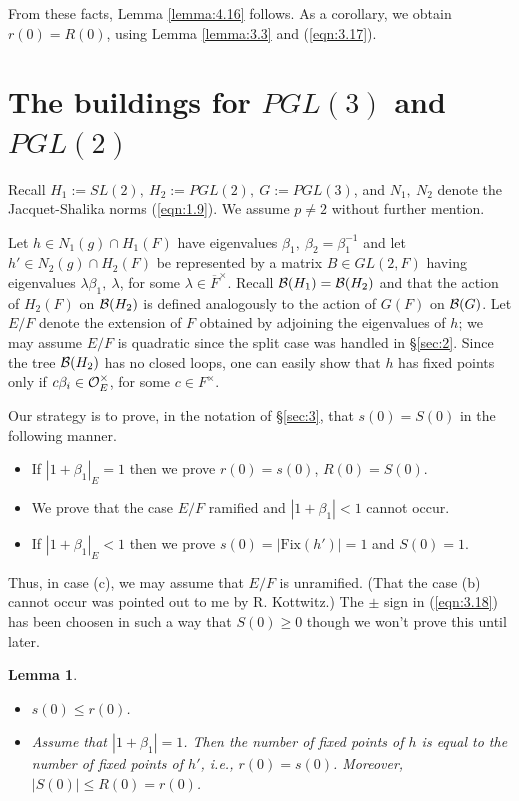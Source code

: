 \documentclass[12pt,letterpaper]{article}
\newtheorem{lemma}[theorem]{Lemma}
\def\oee{{\cal O}_E}
\def\bbg{{\cal B}(G)}
\def\bbh{{\cal B}(H)}
\def\bbH1{{\cal B}(H_1)}
\def\bbh2{{\cal B}(H_2)}
\begin{document}
From these facts, Lemma \ref{lemma:4.16} follows. 
As a corollary, we obtain $r(0)=R(0)$,
using Lemma \ref{lemma:3.3} and (\ref{eqn:3.17}).





\section{The buildings for $PGL(3)$ and $PGL(2)$}
\label{sec:5}

Recall $H_1:=SL(2),\ H_2:=PGL(2),\ G:=PGL(3)$, and $N_1,\ N_2$
denote the Jacquet-Shalika norms (\ref{eqn:1.9}). 
We assume $p\not= 2$ without further mention.
 
Let $h \in N_1(g)\cap H_1(F)$ have eigenvalues $\beta_1,\
\beta_2=\beta_1^{-1}$ and
let $h'\in N_2(g)\cap H_2(F)$ be represented by a matrix $B\in GL(2,F)$
having eigenvalues $\lambda\beta_1,\ \lambda$, for some
$\lambda\in \overline{F}^{\times}$. 
Recall $\bbH1 = \bbh2$ and that the action
of $H_2(F)$ on $\bbh2$ is defined analogously to the action of $G(F)$
on $\bbg$. 
Let $E/F$ denote the extension of $F$ obtained by adjoining the
eigenvalues of $h$; we may assume $E/F$ 
is quadratic since the split case was
handled in \S \ref{sec:2}. 
Since the tree $\bbh2$ has no closed loops, one can easily
show that $h$ has fixed points only if 
$c\beta_i\in \oee^{\times}$, for some $c\in F^{\times}$.
 
Our strategy is
to prove, in the notation of \S \ref{sec:3}, that $s(0)=S(0)$ in the
following manner.

\begin{itemize}
\item[(a)] 
If $|1+\beta_1|_E=1$ then we prove $r(0)=s(0)$, $R(0)=S(0)$.

\item[(b)] 
We prove that the case $E/F$ ramified and $|1+\beta_1|<1$
cannot occur. 

\item[(c)] 
If $|1+\beta_1|_E<1$ then we prove
$s(0)=|\text{Fix}(h')|=1$ and
$S(0)=1$. 

\end{itemize}
Thus, in case (c), we may assume that $E/F$ is
unramified. (That the case (b) cannot occur was
pointed out to me by R. Kottwitz.) 
The $\pm$ sign in (\ref{eqn:3.18}) has been choosen
in such a way that $S(0)\geq 0$ though we won't prove this
until later.

\begin{lemma}
\label{lemma:5.1}
\begin{itemize}
\item[(a)] 
$s(0)\leq r(0)$.

\item[(b)] 
Assume that $|1+\beta_1|=1$. Then the number of
fixed points of $h$ is equal to the number of fixed points of $h'$,
i.e., $r(0)=s(0)$. Moreover, $|S(0)|\leq R(0)=r(0)$.
\end{itemize}
\end{lemma}
\end{document}
